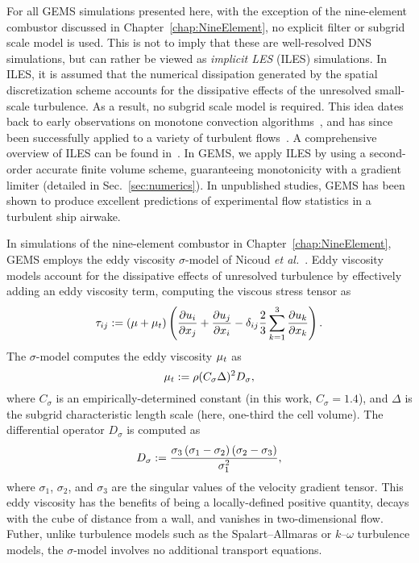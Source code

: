 For all GEMS simulations presented here, with the exception of the nine-element combustor discussed in Chapter~\ref{chap:NineElement}, no explicit filter or subgrid scale model is used. This is not to imply that these are well-resolved DNS simulations, but can rather be viewed as \textit{implicit LES} (ILES) simulations. In ILES, it is assumed that the numerical dissipation generated by the spatial discretization scheme accounts for the dissipative effects of the unresolved small-scale turbulence. As a result, no subgrid scale model is required. This idea dates back to early observations on monotone convection algorithms~\cite{Boris1989}, and has since been successfully applied to a variety of turbulent flows~\cite{Porter1994,Grinstein2005,Bensow2010}. A comprehensive overview of ILES can be found in~\cite{ilesBook}. In GEMS, we apply ILES by using a second-order accurate finite volume scheme, guaranteeing monotonicity with a gradient limiter (detailed in Sec.~\ref{sec:numerics}). In unpublished studies, GEMS has been shown to produce excellent predictions of experimental flow statistics in a turbulent ship airwake.

In simulations of the nine-element combustor in Chapter~\ref{chap:NineElement}, GEMS employs the eddy viscosity $\sigma$-model of Nicoud \textit{et al.}~\cite{Nicoud2011}. Eddy viscosity models account for the dissipative effects of unresolved turbulence by effectively adding an eddy viscosity term, computing the viscous stress tensor as
%
\begin{equation}
	\tau_{i j} := \left(\mu + \mu_{t}\right) \left( \frac{\partial u_{i}}{\partial x_{j}} + \frac{\partial u_{j}}{\partial x_{i}} - \delta_{i j} \frac{2}{3} \sum_{k=1}^3 \frac{\partial u_{k}}{\partial x_{k}} \right).
\end{equation}
%
The $\sigma$-model computes the eddy viscosity $\mu_{t}$ as
%
\begin{equation}
	\mu_{t} := \rho (C_{\sigma} \Delta)^2 D_{\sigma},
\end{equation}
%
where $C_{\sigma}$ is an empirically-determined constant (in this work, $C_{\sigma} = 1.4$), and $\Delta$ is the subgrid characteristic length scale (here, one-third the cell volume). The differential operator $D_{\sigma}$ is computed as
%
\begin{equation}
	D_{\sigma} := \frac{\sigma_3\left(\sigma_1 - \sigma_2\right)\left(\sigma_2 - \sigma_3\right)}{\sigma_1^2},
\end{equation}
%
where $\sigma_1$, $\sigma_2$, and $\sigma_3$ are the singular values of the velocity gradient tensor. This eddy viscosity has the benefits of being a locally-defined positive quantity, decays with the cube of distance from a wall, and vanishes in two-dimensional flow. Futher, unlike turbulence models such as the Spalart--Allmaras or $k$--$\omega$ turbulence models, the $\sigma$-model involves no additional transport equations.


